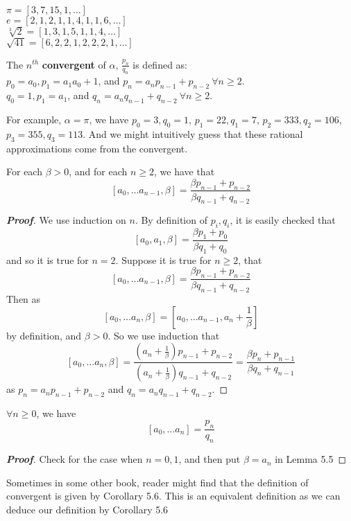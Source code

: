 \begin{example}
$\pi=[3,7,15,1,\ldots]$\\
$e=[2,1,2,1,1,4,1,1,6,\ldots]$\\
$\sqrt[3]{2}=[1,3,1,5,1,1,4,\ldots]$\\
$\sqrt{41}=[6,2,2,1,2,2,2,1,\ldots]$\\
\end{example}

\begin{definition} The $n^{th}$ {\bf convergent} of $\alpha$, $\frac{p_n}{q_n}$ is defined as:\\
$p_0=a_0,p_1=a_1a_0+1$, and $p_n=a_np_{n-1}+p_{n-2}~\forall n \ge 2$.\\
$q_0=1,p_1=a_1$, and $q_n=a_nq_{n-1}+q_{n-2}~\forall n \ge 2$.\\
\end{definition}
For example, $\alpha=\pi$, we have $p_0=3,q_0=1$, $p_1=22,q_1=7$, $p_2=333,q_2=106$, $p_3=355,q_3=113$.
And we might intuitively guess that these rational approximations come from the convergent.
\begin{lemma} For each $\beta>0$, and for each $n \ge 2$, we have that
$$[a_0,\ldots a_{n-1},\beta]=\frac{\beta p_{n-1}+p_{n-2}}{\beta q_{n-1}+q_{n-2}}$$
\end{lemma}
\begin{proof}[\bf Proof] We use induction on $n$. By definition of $p_i,q_i$, it is easily checked that
$$[a_0,a_1,\beta]=\frac{\beta p_1+p_0}{\beta q_1 +q_0}$$ and so it is true for $n=2$.
Suppose it is true for $n \ge 2$, that
$$[a_0,\ldots a_{n-1},\beta]=\frac{\beta p_{n-1}+p_{n-2}}{\beta q_{n-1}+q_{n-2}}$$
Then as
$$[a_0,\ldots a_n,\beta]=[a_0, \ldots a_{n-1},a_n+\frac{1}{\beta}]$$ by definition, and $\beta>0$.
So we use induction that
$$[a_0,\ldots a_n,\beta]=
\frac{(a_n+\frac{1}{\beta})p_{n-1}+p_{n-2}}{(a_n+\frac{1}{\beta})q_{n-1}+q_{n-2}}
=\frac{\beta p_n+p_{n-1}}{\beta q_n+q_{n-1}}$$
as $p_n=a_n p_{n-1}+p_{n-2}$ and $q_n=a_n q_{n-1}+q_{n-2}$.
\end{proof}
\begin{corollary} $\forall n \ge 0$, we have
$$[a_0,\ldots a_n]=\frac{p_n}{q_n}$$
\end{corollary}
\begin{proof}[\bf Proof] Check for the case when $n=0,1$, and then put $\beta=a_n$ in Lemma 5.5
\end{proof}
\begin{remark} Sometimes in some other book, reader might find that the definition of convergent is given by Corollary 5.6. This is an equivalent definition as we can deduce our definition by Corollary 5.6
\end{remark}
